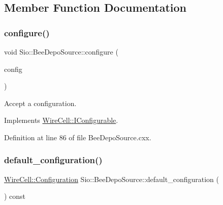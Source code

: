 \subsection{Member Function Documentation}
\mbox{\label{class_wire_cell_1_1_sio_1_1_bee_depo_source_a3c1f29938d5d3c0a5622f78ee777bb02}} 
\subsubsection{\texorpdfstring{configure()}{configure()}}
{\footnotesize\ttfamily void Sio\+::\+Bee\+Depo\+Source\+::configure (\begin{DoxyParamCaption}\item[{const \hyperlink{namespace_wire_cell_a9f705541fc1d46c608b3d32c182333ee}{Wire\+Cell\+::\+Configuration} \&}]{config }\end{DoxyParamCaption})\hspace{0.3cm}{\ttfamily [virtual]}}



Accept a configuration. 



Implements \hyperlink{class_wire_cell_1_1_i_configurable_a57ff687923a724093df3de59c6ff237d}{Wire\+Cell\+::\+I\+Configurable}.



Definition at line 86 of file Bee\+Depo\+Source.\+cxx.

\mbox{\label{class_wire_cell_1_1_sio_1_1_bee_depo_source_af5303df21129d427f592bf101d4fcefb}} 
\subsubsection{\texorpdfstring{default\+\_\+configuration()}{default\_configuration()}}
{\footnotesize\ttfamily \hyperlink{namespace_wire_cell_a9f705541fc1d46c608b3d32c182333ee}{Wire\+Cell\+::\+Configuration} Sio\+::\+Bee\+Depo\+Source\+::default\+\_\+configuration (\begin{DoxyParamCaption}{ }\end{DoxyParamCaption}) const\hspace{0.3cm}{\ttfamily [virtual]}}



